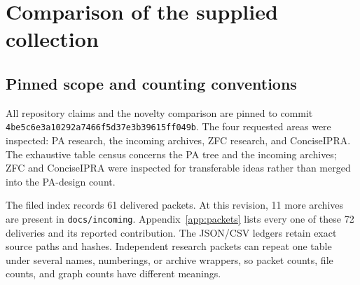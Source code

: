 \documentclass[11pt]{article}
\newcommand{\file}[1]{\nolinkurl{#1}}
\newcommand{\repo}{\texttt{4be5c6e3a10292a7466f5d3\allowbreak68\allowbreak7e3b39615ff049b}}
\begin{document}
\section{Comparison of the supplied collection}
\label{sec:comparison}
\subsection{Pinned scope and counting conventions}
All repository claims and the novelty comparison are pinned to commit
\repo. The four requested areas were inspected: PA research, the incoming
archives, ZFC research, and ConciseIPRA. The exhaustive table census concerns
the PA tree and the incoming archives; ZFC and ConciseIPRA were inspected
for transferable ideas rather than merged into the PA-design count.

The filed index records 61 delivered packets. At this revision, 11 more
archives are present in \file{docs/incoming}. Appendix~\ref{app:packets}
lists every one of these 72 deliveries and its reported contribution.
The JSON/CSV ledgers retain exact source paths and hashes. Independent
research packets can repeat one table under several names, numberings, or
archive wrappers, so packet counts, file counts, and graph counts have
different meanings.
\end{document}
